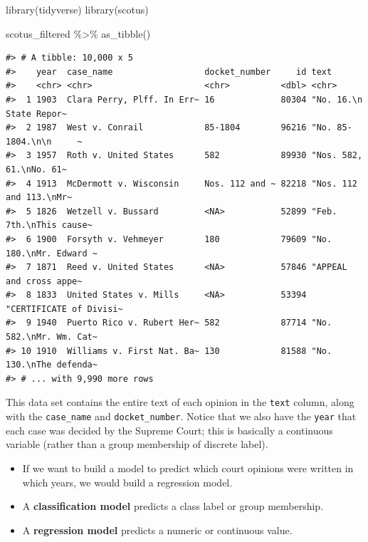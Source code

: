 \documentclass[
]{krantz}
\makeatletter
\newenvironment{Shaded}{\begin{snugshade}}{\end{snugshade}}
\newcommand{\FunctionTok}[1]{\textcolor[rgb]{0.00,0.00,0.00}{#1}}
\newcommand{\NormalTok}[1]{#1}
\newcommand{\SpecialCharTok}[1]{\textcolor[rgb]{0.00,0.00,0.00}{#1}}
\newenvironment{kframe}{%
\medskip{}
\setlength{\fboxsep}{.8em}
 \def\at@end@of@kframe{}%
 \ifinner\ifhmode%
  \def\at@end@of@kframe{\end{minipage}}%
  \begin{minipage}{\columnwidth}%
 \fi\fi%
 \def\FrameCommand##1{\hskip\@totalleftmargin \hskip-\fboxsep
 \colorbox{shadecolor}{##1}\hskip-\fboxsep
     \hskip-\linewidth \hskip-\@totalleftmargin \hskip\columnwidth}%
 \MakeFramed {\advance\hsize-\width
   \@totalleftmargin\z@ \linewidth\hsize
   \@setminipage}}%
 {\par\unskip\endMakeFramed%
 \at@end@of@kframe}
\renewenvironment{Shaded}{\begin{kframe}}{\end{kframe}}
\newenvironment{rmdblock}[1]
  {\begin{shaded*}
  \begin{itemize}[left = -1cm, labelsep = 1cm]
  \renewcommand{\labelitemi}{
    \raisebox{-.7\height}[0pt][0pt]{
      {\setkeys{Gin}{width=3em,keepaspectratio}\texttt{[image: images/\#1]}}
    }
  }
 
  \item
  }
  {
  \end{itemize}
  \end{shaded*}
  }
\newenvironment{rmdnote}
  {\begin{rmdblock}{note}}
  {\end{rmdblock}}
\makeatother
\begin{document}
\begin{Shaded}
\begin{Highlighting}[]
\FunctionTok{library}\NormalTok{(tidyverse)}
\FunctionTok{library}\NormalTok{(scotus)}

\NormalTok{scotus\_filtered }\SpecialCharTok{\%\textgreater{}\%}
  \FunctionTok{as\_tibble}\NormalTok{()}
\end{Highlighting}
\end{Shaded}

\begin{verbatim}
#> # A tibble: 10,000 x 5
#>    year  case_name                  docket_number     id text                   
#>    <chr> <chr>                      <chr>          <dbl> <chr>                  
#>  1 1903  Clara Perry, Plff. In Err~ 16             80304 "No. 16.\n State Repor~
#>  2 1987  West v. Conrail            85-1804        96216 "No. 85-1804.\n\n     ~
#>  3 1957  Roth v. United States      582            89930 "Nos. 582, 61.\nNo. 61~
#>  4 1913  McDermott v. Wisconsin     Nos. 112 and ~ 82218 "Nos. 112 and 113.\nMr~
#>  5 1826  Wetzell v. Bussard         <NA>           52899 "Feb. 7th.\nThis cause~
#>  6 1900  Forsyth v. Vehmeyer        180            79609 "No. 180.\nMr. Edward ~
#>  7 1871  Reed v. United States      <NA>           57846 "APPEAL and cross appe~
#>  8 1833  United States v. Mills     <NA>           53394 "CERTIFICATE of Divisi~
#>  9 1940  Puerto Rico v. Rubert Her~ 582            87714 "No. 582.\nMr. Wm. Cat~
#> 10 1910  Williams v. First Nat. Ba~ 130            81588 "No. 130.\nThe defenda~
#> # ... with 9,990 more rows
\end{verbatim}

This data set contains the entire text of each opinion in the \texttt{text} column, along with the \texttt{case\_name} and \texttt{docket\_number}. Notice that we also have the \texttt{year} that each case was decided by the Supreme Court; this is basically a continuous variable (rather than a group membership of discrete label).

\begin{rmdnote}
If we want to build a model to predict which court opinions were written
in which years, we would build a regression model.
\end{rmdnote}

\begin{itemize}
\item
  A \textbf{classification model} predicts a class label or group membership.
\item
  A \textbf{regression model} predicts a numeric or continuous value.
\end{itemize}
\end{document}
